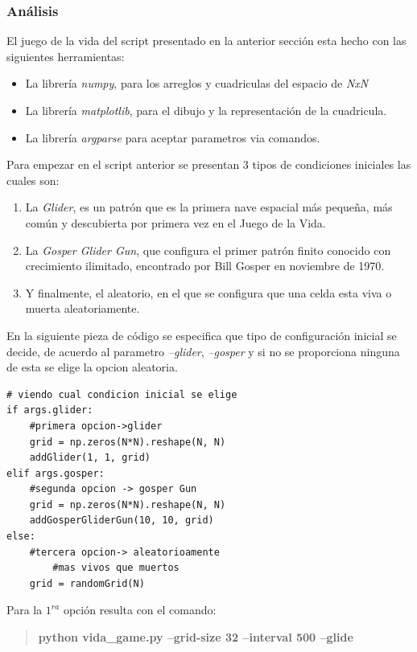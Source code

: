 \documentclass[a4paper,12pt]{article}
\newcommand{\eq}[1]{$#1$}
\begin{document}


\subsubsection{Análisis}

El juego de la vida del script presentado en la anterior sección esta hecho
con las siguientes herramientas:
\begin{itemize}
    \item La librería \emph{numpy}, para los arreglos y cuadriculas del espacio de \emph{NxN}
    \item La librería \emph{matplotlib}, para el dibujo y la representación de la cuadricula.
    \item La librería \emph{argparse} para aceptar parametros via comandos.
\end{itemize}
\clearpage
Para empezar en el script anterior se presentan 3 tipos de condiciones iniciales las cuales son:
\begin{enumerate}
    \item La \emph{Glider}\cite{cita4}, es un patrón que es la primera nave espacial más pequeña, más común y descubierta por primera vez en el Juego de la Vida.
    \item La \emph{Gosper Glider Gun}\cite{cita5}, que configura el primer patrón finito conocido con crecimiento ilimitado, encontrado por Bill Gosper en noviembre de 1970.
    \item Y finalmente, el aleatorio, en el que se configura que una celda esta viva o muerta aleatoriamente.
\end{enumerate}
En la siguiente pieza de código se especifica que tipo de configuración inicial se decide, 
de acuerdo al parametro \emph{--glider}, \emph{--gosper} y si no se proporciona ninguna de esta se elige la opcion aleatoria.
\begin{lstlisting}
# viendo cual condicion inicial se elige
if args.glider:
    #primera opcion->glider
    grid = np.zeros(N*N).reshape(N, N)
    addGlider(1, 1, grid)
elif args.gosper:
    #segunda opcion -> gosper Gun
    grid = np.zeros(N*N).reshape(N, N)
    addGosperGliderGun(10, 10, grid)
else: 
    #tercera opcion-> aleatorioamente
        #mas vivos que muertos
    grid = randomGrid(N)
\end{lstlisting}

Para la \eq{1^{ra}} opción resulta con el comando:
\begin{quotation}
    \centering
    {\bfseries \ttfamily python vida\_game.py --grid-size 32 --interval 500 --glide}
\end{quotation}
\end{document}
